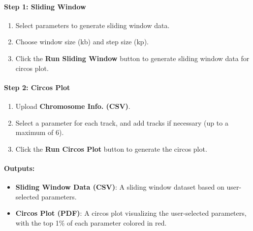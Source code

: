 \documentclass[
]{book}
\begin{document}
\paragraph*{\texorpdfstring{\textbf{Step 1: Sliding Window}}{Step 1: Sliding Window}}\label{step-1-sliding-window}

\begin{enumerate}
\def\labelenumi{\arabic{enumi}.}
\item
  Select parameters to generate sliding window data.
\item
  Choose window size (kb) and step size (kp).
\item
  Click the {\textbf{Run Sliding Window}} button to generate sliding window data for circos plot.
\end{enumerate}

\paragraph*{\texorpdfstring{\textbf{Step 2: Circos Plot}}{Step 2: Circos Plot}}\label{step-2-circos-plot}

\begin{enumerate}
\def\labelenumi{\arabic{enumi}.}
\item
  {Upload} \textbf{Chromosome Info. (CSV)}.
\item
  Select a parameter for each track, and add tracks if necessary (up to a maximum of 6).
\item
  Click the {\textbf{Run Circos Plot}} button to generate the circos plot.
\end{enumerate}

\paragraph*{Outputs:}\label{outputs-13}

\begin{itemize}
\item
  \textbf{Sliding Window Data (CSV)}: A sliding window dataset based on user-selected parameters.
\item
  \textbf{Circos Plot (PDF)}: A circos plot visualizing the user-selected parameters, with the top 1\% of each parameter colored in red.
\end{itemize}
\end{document}
